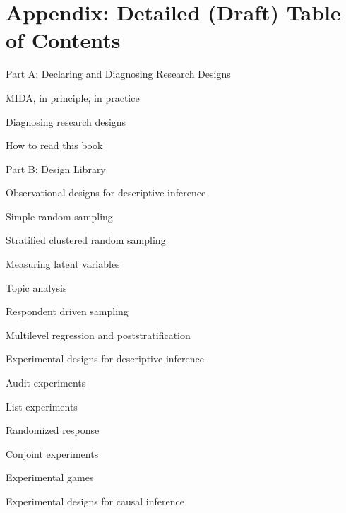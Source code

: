 \documentclass[11pt]{article}
\begin{document}
\appendix
\section{Appendix: Detailed (Draft) Table of Contents \label{app:toc}}

\begin{legal}
\item {Part A: Declaring and Diagnosing Research Designs}

	\begin{legal}
	\item  MIDA, in principle, in practice
	\item  Diagnosing research designs
	\item  How to read this book
	\end{legal}

\item Part B: Design Library

	\begin{legal}
	\item Observational designs for descriptive inference
	
		\begin{legal}
		\item Simple random sampling
		\item Stratified clustered random sampling
		\item Measuring latent variables
		\item Topic analysis
		\item Respondent driven sampling
		\item Multilevel regression and poststratification
		\end{legal}
	
	\item Experimental designs for descriptive inference
	
		\begin{legal}
		\item 	Audit experiments
		\item 	List experiments
		\item 	Randomized response
		\item 	Conjoint experiments
		\item 	Experimental games
		\end{legal}
	
	\item Experimental designs for causal inference
	

\end{legal}
\end{legal}
\end{document}
